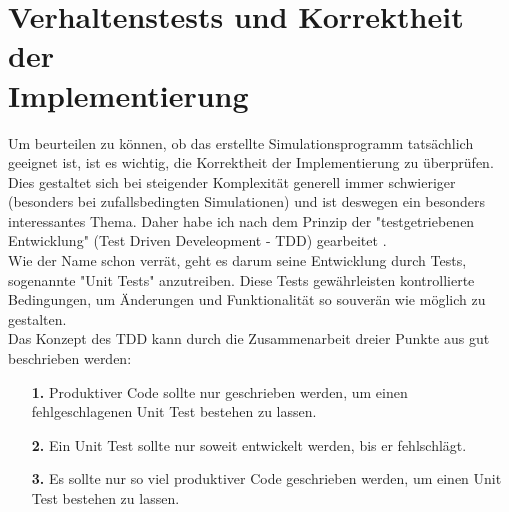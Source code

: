 \documentclass[11pt, a4paper, german]{article}
\theoremstyle{plain}
\begin{document}
\section{Verhaltenstests und Korrektheit der \\Implementierung}
Um beurteilen zu können, ob das erstellte Simulationsprogramm tatsächlich geeignet ist, ist es wichtig, die Korrektheit der Implementierung zu über\-prüfen. Dies gestaltet sich bei steigender Komplexität generell immer schwieriger (besonders bei zufallsbedingten Simulationen) und ist deswegen ein besonders interessantes Thema. Daher habe ich nach dem Prinzip der "{}testgetriebenen Entwicklung"{}  (Test Driven Develeopment - TDD) gearbeitet \cite{martin2007professionalism}.\\
Wie der Name schon verrät, geht es darum seine Entwicklung durch Tests, sogenannte "{}Unit Tests"{} anzutreiben. Diese Tests gewährleisten kontrollierte Bedingungen, um Änderungen und Funktionalität so souverän wie möglich zu gestalten.\\
Das Konzept des TDD kann durch die Zusammenarbeit dreier Punkte aus \cite{martin2008clean} gut beschrieben werden:
\begin{itemize}
	\item[\textbf{1.}] Produktiver Code sollte nur geschrieben werden, um einen fehlgeschlagenen Unit Test bestehen zu lassen.
	\item[\textbf{2.}] Ein Unit Test sollte nur soweit entwickelt werden, bis er fehlschlägt.
	\item[\textbf{3.}] Es sollte nur so viel produktiver Code geschrieben werden, um einen Unit Test bestehen zu lassen. \label{3Punkte}
\end{itemize}
\end{document}
